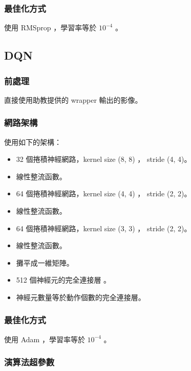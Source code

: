 \documentclass[fleqn,a4paper,12pt]{article}
\begin{document}
\subsubsection*{最佳化方式}

使用 RMSprop ，學習率等於 $10^{-4}$ 。

\subsection{DQN}

\subsubsection*{前處理}

直接使用助教提供的 wrapper 輸出的影像。

\subsubsection*{網路架構}

使用如下的架構：

\begin{itemize}
\item 32 個捲積神經網路，kernel size (8, 8) ， stride (4, 4)。
\item 線性整流函數。
\item 64 個捲積神經網路，kernel size (4, 4) ， stride (2, 2)。
\item 線性整流函數。
\item 64 個捲積神經網路，kernel size (3, 3) ， stride (2, 2)。
\item 線性整流函數。
\item 攤平成一維矩陣。
\item 512 個神經元的完全連接層 。
\item 神經元數量等於動作個數的完全連接層。
\end{itemize}

\subsubsection*{最佳化方式}

使用 Adam ，學習率等於 $10^{-4}$ 。

\subsubsection*{演算法超參數}
\end{document}
